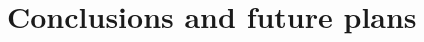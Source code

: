 \documentclass{webofc}
\begin{document}
\section{Conclusions and future plans}
\label{sec-concl}

%
%
%
%
% 
%
%
\end{document}
